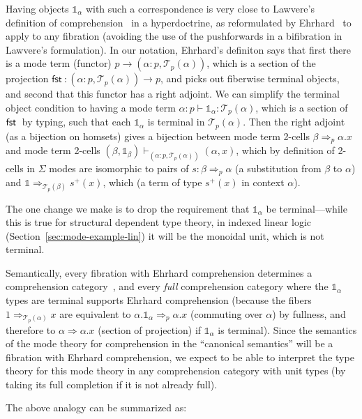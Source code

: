 \documentclass[10pt]{article}
\theoremstyle{definition}
\newcommand\dsd[1]{\ensuremath{\mathsf{#1}}}
\newcommand{\tcell}{\Rightarrow}
\newcommand{\app}[2]{\ensuremath{#1 \: #2}}
\newcommand{\sigmacl}[3]{\ensuremath{(#1{:}#2,#3)}}
\newcommand{\fst}[1]{\app{\dsd{fst}}{#1}}
\newcommand\TrPlus[2]{\ensuremath{{#1}^+(#2)}}
\newcommand\El[2]{\mathcal{T}_{#1}(#2)}
\newcommand\One{\ensuremath{\mathds{1}}}
\begin{document}
Having objects $\One_\alpha$ with such a correspondence is very close to
Lawvere's definition of comprehension~\citep{lawvere70comprehension} in
a hyperdoctrine, as reformulated by
Ehrhard~\citep{ehrhardXXcomprehension} to apply to any fibration
(avoiding the use of the pushforwards in a bifibration in Lawvere's
formulation).  In our notation, Ehrhard's definiton says that first
there is a mode term (functor) $p \to
\sigmacl{\alpha}{p}{\El{p}{\alpha}}$, which is a section of the
projection $\fst : \sigmacl{\alpha}{p}{\El{p}{\alpha}} \to p$, and picks
out fiberwise terminal objects, and second that this functor has a right
adjoint.  We can simplify the terminal object condition to having a mode
term $\alpha : p \vdash \One_\alpha : \El{p} \alpha$, which is a section
of $\fst$ by typing, such that each $\One_\alpha$ is terminal in
$\El{p}{\alpha}$.  Then the right adjoint (as a bijection on homsets)
gives a bijection between mode term 2-cells $\beta \tcell_p \alpha.x$
and mode term 2-cells $(\beta,\One_\beta)
\vdash_{\sigmacl{\alpha}{p}{\El{p}{\alpha}}} (\alpha,x)$, which by
definition of 2-cells in $\Sigma$ modes are isomorphic to pairs of $s :
\beta \tcell_p \alpha$ (a substitution from $\beta$ to $\alpha$) and
$\One \tcell_{\El p \beta} \TrPlus{s}{x}$, which (a term of type
$\TrPlus s x$ in
context $\alpha$).

The one change we make is to drop the requirement that $\One_\alpha$ be
terminal---while this is true for structural dependent type theory, in
indexed linear logic (Section~\ref{sec:mode-example-lin}) it will be the
monoidal unit, which is not terminal.

Semantically, every fibration with Ehrhard comprehension determines a
comprehension category~\citep{jacobs93comprehension}, and every
\emph{full} comprehension category where the $\One_\alpha$ types are
terminal supports Ehrhard comprehension (because the fibers $1
\tcell_{\El p \alpha} x$ are equivalent to $\alpha.\One_\alpha \tcell_p
\alpha.x$ (commuting over $\alpha$) by fullness, and therefore to
$\alpha \tcell \alpha.x$ (section of projection) if $\One_\alpha$ is
terminal).  Since the semantics of the mode theory for comprehension in
the ``canonical semantics'' will be a fibration with Ehrhard
comprehension, we expect to be able to interpret the type theory for
this mode theory in any comprehension category with unit types (by
taking its full completion if it is not already full).  

The above analogy can be summarized as:
\end{document}
